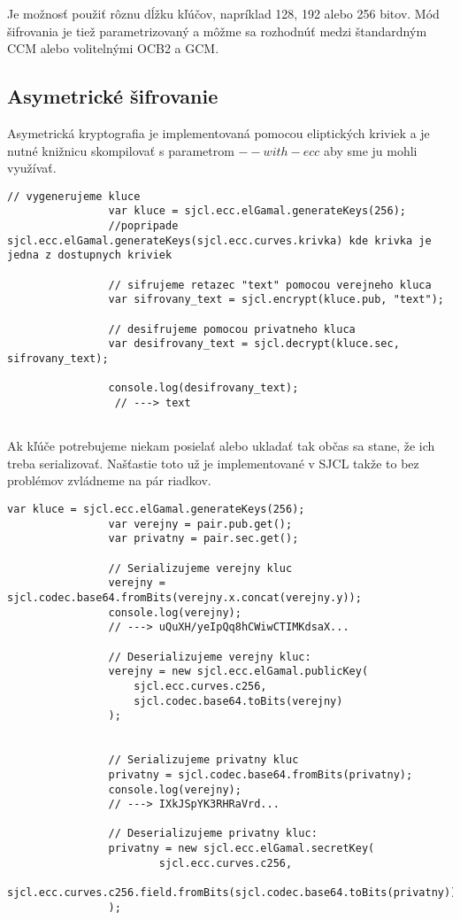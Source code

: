 			Je možnosť použiť rôznu dĺžku kľúčov, napríklad 128, 192 alebo 256 bitov. Mód šifrovania je tiež parametrizovaný a môžme sa rozhodnúť medzi štandardným CCM alebo volitelnými OCB2 a GCM.
	
		
		\subsection{Asymetrické šifrovanie}
	
			Asymetrická kryptografia je implementovaná pomocou eliptických kriviek a je nutné knižnicu skompilovať s parametrom $--with-ecc$ aby sme ju mohli využívať.
			\medskip
			\begin{lstlisting}[caption=Asymetrické šifrovanie]
				// vygenerujeme kluce
				var kluce = sjcl.ecc.elGamal.generateKeys(256);
				//popripade sjcl.ecc.elGamal.generateKeys(sjcl.ecc.curves.krivka) kde krivka je jedna z dostupnych kriviek
				
				// sifrujeme retazec "text" pomocou verejneho kluca
				var sifrovany_text = sjcl.encrypt(kluce.pub, "text"); 
				
				// desifrujeme pomocou privatneho kluca
				var desifrovany_text = sjcl.decrypt(kluce.sec, sifrovany_text);  
				
				console.log(desifrovany_text);   
				 // ---> text
				
			\end{lstlisting}		
			
			Ak kľúče potrebujeme niekam posielať alebo ukladať tak občas sa stane, že ich treba serializovať. Našťastie toto už je implementované v SJCL takže to bez problémov zvládneme na pár riadkov.
			
			\medskip
			\begin{lstlisting}[caption=Serializácia]
				var kluce = sjcl.ecc.elGamal.generateKeys(256);
				var verejny = pair.pub.get();
				var privatny = pair.sec.get();

				// Serializujeme verejny kluc
				verejny = sjcl.codec.base64.fromBits(verejny.x.concat(verejny.y));
				console.log(verejny);
				// ---> uQuXH/yeIpQq8hCWiwCTIMKdsaX...

				// Deserializujeme verejny kluc:
				verejny = new sjcl.ecc.elGamal.publicKey(
 					sjcl.ecc.curves.c256,
					sjcl.codec.base64.toBits(verejny)
				);


				// Serializujeme privatny kluc
				privatny = sjcl.codec.base64.fromBits(privatny);
				console.log(verejny);
				// ---> IXkJSpYK3RHRaVrd...

				// Deserializujeme privatny kluc:
				privatny = new sjcl.ecc.elGamal.secretKey(
    					sjcl.ecc.curves.c256,
    					sjcl.ecc.curves.c256.field.fromBits(sjcl.codec.base64.toBits(privatny))
				);
				
			\end{lstlisting}	
	
